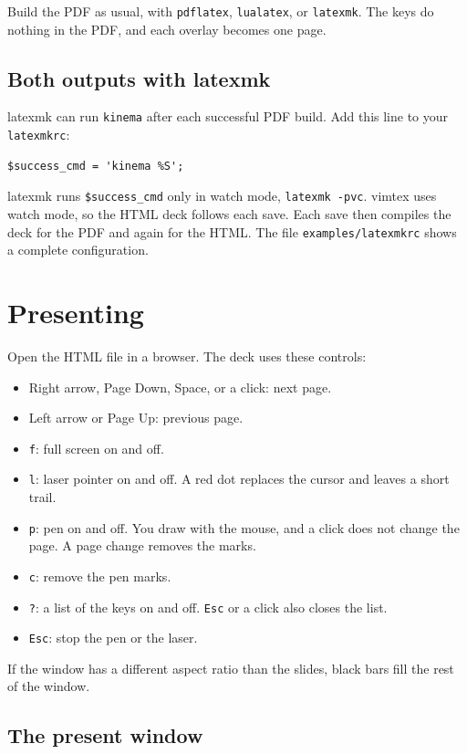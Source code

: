 \documentclass[11pt]{article}
\newcommand{\cmd}[1]{\texttt{#1}}
\begin{document}
Build the PDF as usual, with \cmd{pdflatex}, \cmd{lualatex}, or \cmd{latexmk}.
The keys do nothing in the PDF, and each overlay becomes one page.

\subsection{Both outputs with latexmk}

latexmk can run \cmd{kinema} after each successful PDF build. Add this line to
your \cmd{latexmkrc}:
\begin{lstlisting}
$success_cmd = 'kinema %S';
\end{lstlisting}
latexmk runs \cmd{\$success\_cmd} only in watch mode, \cmd{latexmk -pvc}. vimtex
uses watch mode, so the HTML deck follows each save. Each save then compiles the
deck for the PDF and again for the HTML. The file
\cmd{examples/latexmkrc} shows a complete configuration.

\section{Presenting}

Open the HTML file in a browser. The deck uses these controls:
\begin{itemize}
	\item Right arrow, Page Down, Space, or a click: next page.
	\item Left arrow or Page Up: previous page.
	\item \cmd{f}: full screen on and off.
	\item \cmd{l}: laser pointer on and off. A red dot replaces the cursor and
	      leaves a short trail.
	\item \cmd{p}: pen on and off. You draw with the mouse, and a click does not
	      change the page. A page change removes the marks.
	\item \cmd{c}: remove the pen marks.
	\item \cmd{?}: a list of the keys on and off. \cmd{Esc} or a click also closes
	      the list.
	\item \cmd{Esc}: stop the pen or the laser.
\end{itemize}

If the window has a different aspect ratio than the slides, black bars fill the
rest of the window.

\subsection{The present window}
\end{document}
